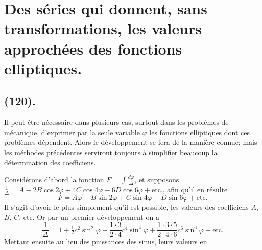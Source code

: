 \documentclass{article}
\begin{document}
\section*{Des séries qui donnent, sans transformations, les valeurs approchées des fonctions elliptiques.}

\subsection*{(120).}

Il peut être nécessaire dans plusieurs cas, surtout dans les problèmes de mécanique, d'exprimer par la seule variable $\varphi$ les fonctions elliptiques dont ces problèmes dépendent. Alors le développement se fera de la manière connue; mais les méthodes précédentes serviront toujours à simplifier beaucoup la détermination des coefficiens.

Considérons d'abord la fonction $F=\displaystyle\int\frac{d\varphi}{\Delta}$, et supposons $\frac{1}{\Delta}=A-2B\cos2\varphi+4C\cos4\varphi-6D\cos6\varphi+\text{etc.}$, afin qu'il en résulte
\[ F=A\varphi-B\sin2\varphi+C\sin4\varphi-D\sin6\varphi+\text{etc.} \]
Il s'agit d'avoir le plus simplement qu'il est possible, les valeurs des coefficiens $A$, $B$, $C$, etc. Or par un premier développement on a
\[ \frac{1}{\Delta}=1+\tfrac{1}{2}c^{2}\sin^{2}\varphi+\frac{1\cdot3}{2\cdot4}c^{4}\sin^{4}\varphi+\frac{1\cdot3\cdot5}{2\cdot4\cdot6}c^{6}\sin^{6}\varphi+\text{etc.} \]
Mettant ensuite au lieu des puissances des sinus, leurs valeurs en
\end{document}
